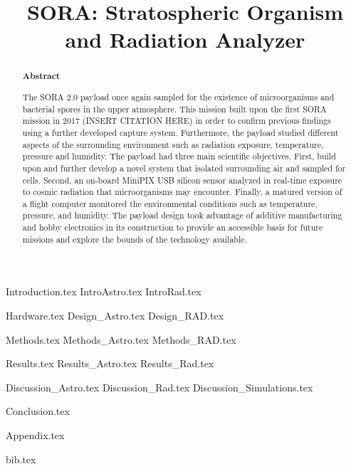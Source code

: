 \documentclass[aps,superscriptaddress,floatfix,nofootinbib,showpacs,amsmath,amssymb,altaffilletter,floatfix,onecolumn]{revtex4-1}
\begin{document}
\title{SORA: Stratospheric Organism and Radiation Analyzer}

\begin{abstract}
\begin{center}
{\bf Abstract}
\end{center}
The SORA 2.0 payload once again sampled for the existence of microorganisms and bacterial spores in the upper atmosphere.  This mission built upon the first SORA mission in 2017 (INSERT CITATION HERE) in order to confirm previous findings using a further developed capture system.  Furthermore, the payload studied different aspects of the surrounding environment such as radiation exposure, temperature, pressure and humidity. The payload had three main scientific objectives. First, build upon and further develop a novel system that isolated surrounding air and sampled for cells.  Second, an on-board MiniPIX USB silicon sensor analyzed in real-time exposure to cosmic radiation that microorganisms may encounter.  Finally, a matured version of a flight computer monitored the environmental conditions such as temperature, pressure, and humidity.  The payload design took advantage of additive manufacturing and hobby electronics in its construction to provide an accessible basis for future missions and explore the bounds of the technology available. 

\newpage %
\end{abstract}

\setlength{\parindent}{1em}
\setdefaultleftmargin{1em}{1em}{}{}{}{}
\setcounter{page}{0}\thispagestyle{empty}
\maketitle
\onecolumngrid
\setcounter{tocdepth}{2}
\setcounter{page}{0}\thispagestyle{empty}
\tableofcontents
\setcounter{page}{0}\thispagestyle{empty}
\newpage
\onecolumngrid

{Introduction.tex}
{IntroAstro.tex}
{IntroRad.tex}

{Hardware.tex}
{Design_Astro.tex}
{Design_RAD.tex}

{Methods.tex}
{Methods_Astro.tex}
{Methods_RAD.tex}

{Results.tex} 
{Results_Astro.tex} 
{Results_Rad.tex} 


{Discussion_Astro.tex}
{Discussion_Rad.tex}
{Discussion_Simulations.tex}

{Conclusion.tex} 
\newpage

{Appendix.tex}
\newpage

{bib.tex}%

\clearpage

\end{document}
